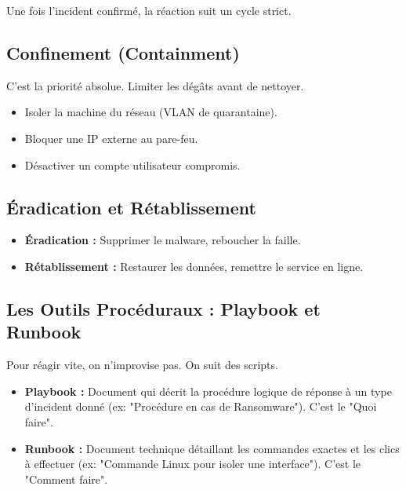 Une fois l'incident confirmé, la réaction suit un cycle strict.

\subsection{Confinement (Containment)}

C'est la priorité absolue. Limiter les dégâts avant de nettoyer.
\begin{itemize}
    \item Isoler la machine du réseau (VLAN de quarantaine).
    \item Bloquer une IP externe au pare-feu.
    \item Désactiver un compte utilisateur compromis.
\end{itemize}

\subsection{Éradication et Rétablissement}

\begin{itemize}
    \item \textbf{Éradication :} Supprimer le malware, reboucher la faille.
    \item \textbf{Rétablissement :} Restaurer les données, remettre le service en ligne.
\end{itemize}

\subsection{Les Outils Procéduraux : Playbook et Runbook}

Pour réagir vite, on n'improvise pas. On suit des scripts.

\begin{boxdef}
\begin{itemize}
    \item \textbf{Playbook :} Document qui décrit la procédure logique de réponse à un type d'incident donné (ex: "Procédure en cas de Ransomware"). C'est le "Quoi faire".
    \item \textbf{Runbook :} Document technique détaillant les commandes exactes et les clics à effectuer (ex: "Commande Linux pour isoler une interface"). C'est le "Comment faire".
\end{itemize}
\end{boxdef}

